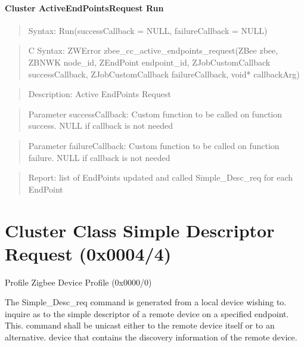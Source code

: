 \paragraph{Cluster ActiveEndPointsRequest Run}
\begin{quote}Syntax: Run(successCallback = NULL, failureCallback = NULL)\end{quote}
\begin{quote}C Syntax: ZWError zbee\_cc\_active\_endpoints\_request(ZBee zbee, ZBNWK node\_id, ZEndPoint endpoint\_id, ZJobCustomCallback successCallback, ZJobCustomCallback failureCallback, void* callbackArg)\end{quote}
\begin{quote}Description: Active EndPoints Request\end{quote}
\begin{quote}Parameter successCallback: Custom function to be called on function success. NULL if callback is not needed\end{quote}
\begin{quote}Parameter failureCallback: Custom function to be called on function failure. NULL if callback is not needed\end{quote}
\begin{quote}Report: list of EndPoints updated and called Simple\_Desc\_req for each EndPoint\end{quote}


\section{Cluster Class Simple Descriptor Request (0x0004/4)}

Profile Zigbee Device Profile (0x0000/0)

The Simple\_Desc\_req command is generated from a local device wishing to. inquire as to the simple descriptor of a remote device on a specified endpoint. This. command shall be unicast either to the remote device itself or to an alternative. device that contains the discovery information of the remote device.
